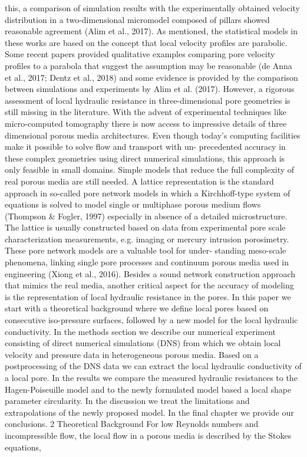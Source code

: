 this, a comparison of simulation results with the experimentally obtained velocity distribution in a two-dimensional micromodel composed of pillars showed reasonable agreement (Alim et al., 2017). As mentioned, the statistical models in these works are based
on the concept that local velocity profiles are parabolic. Some recent papers provided qualitative examples comparing pore velocity profiles to a parabola that suggest the assumption may be reasonable (de Anna et al., 2017; Dentz et al., 2018) and some evidence is provided by the comparison between simulations and experiments by Alim et al. (2017). However, a rigorous assessment of local hydraulic resistance in three-dimensional pore geometries is still missing in the literature.
With the advent of experimental techniques like micro-computed tomography there is now access to impressive details of three dimensional porous media architectures. Even though today’s computing facilities make it possible to solve flow and transport with un- precedented accuracy in these complex geometries using direct numerical simulations,
this approach is only feasible in small domains. Simple models that reduce the full complexity of real porous media are still needed. A lattice representation is the standard approach in so-called pore network models in which a Kirchhoff-type system of equations
is solved to model single or multiphase porous medium flows (Thompson & Fogler, 1997) especially in absence of a detailed microstructure. The lattice is usually constructed based on data from experimental pore scale characterization measurements, e.g. imaging or mercury intrusion porosimetry. These pore network models are a valuable tool for under- standing meso-scale phenomena, linking single pore processes and continuum porous media used in engineering (Xiong et al., 2016). Besides a sound network construction approach that mimics the real media, another critical aspect for the accuracy of modeling
is the representation of local hydraulic resistance in the pores.
In this paper we start with a theoretical background where we define local pores based on consecutive iso-pressure surfaces, followed by a new model for the local hydraulic conductivity. In the methods section we describe our numerical experiment consisting
of direct numerical simulations (DNS) from which we obtain local velocity and pressure data in heterogeneous porous media. Based on a postprocessing of the DNS data we can extract the local hydraulic conductivity of a local pore. In the results we compare the measured hydraulic resistances to the Hagen-Poiseuille model and to the newly formulated model based a local shape parameter circularity. In the discussion we treat the limitations and extrapolations of the newly proposed model. In the final chapter we provide our conclusions.
2 Theoretical Background
For low Reynolds numbers and incompressible flow, the local flow in a porous media is described by the Stokes equations,

